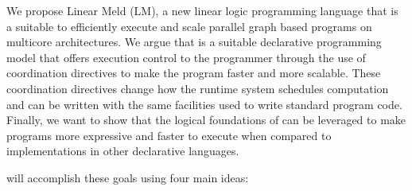 
We propose Linear Meld (LM), a new linear logic programming language that is a suitable
to efficiently execute and scale parallel graph based programs on multicore architectures.
We argue that \lang is a suitable declarative programming model that offers execution
control to the programmer through the use of coordination directives to make the program
faster and more scalable. These coordination
directives change how the runtime system schedules computation and can be written with the same
facilities used to write standard program code. Finally, we want to show that the logical foundations
of \lang can be leveraged to make programs more expressive and faster to execute when compared to implementations
in other declarative languages.

\lang will accomplish these goals using four main ideas:


